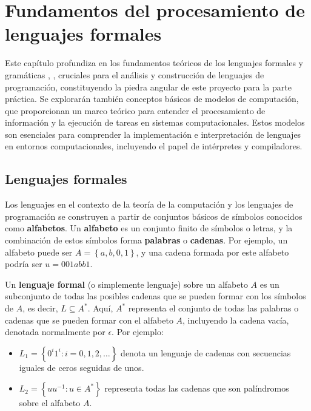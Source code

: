 \chapter{\textbf{Fundamentos del procesamiento de lenguajes formales}}
Este capítulo profundiza en los fundamentos teóricos de los lenguajes formales y gramáticas \cite{aho1990compiladores}, \cite{hopcroft2010introduccion}, cruciales para el análisis y construcción de lenguajes de programación, constituyendo la piedra angular de este proyecto para la parte práctica. Se explorarán también conceptos básicos de modelos de computación, que proporcionan un marco teórico para entender el procesamiento de información y la ejecución de tareas en sistemas computacionales. Estos modelos son esenciales para comprender la implementación e interpretación de lenguajes en entornos computacionales, incluyendo el papel de intérpretes y compiladores.

\section{Lenguajes formales}\label{section:languages}
Los lenguajes en el contexto de la teoría de la computación y los lenguajes de programación se construyen a partir de conjuntos básicos de símbolos conocidos como \textbf{alfabetos}. Un \textbf{alfabeto} es un conjunto finito de símbolos o letras, y la combinación de estos símbolos forma \textbf{palabras} o \textbf{cadenas}. Por ejemplo, un alfabeto puede ser $A = \left\lbrace a, b, 0, 1 \right\rbrace$, y una cadena formada por este alfabeto podría ser $u = 001abb1$.

Un \textbf{lenguaje formal} (o simplemente lenguaje) sobre un alfabeto $A$ es un subconjunto de todas las posibles cadenas que se pueden formar con los símbolos de $A$, es decir, $L \subseteq A^*$. Aquí, $A^*$ representa el conjunto de todas las palabras o cadenas que se pueden formar con el alfabeto $A$, incluyendo la cadena vacía, denotada normalmente por $\epsilon$. Por ejemplo:

\begin{itemize}
\item $L_1 = \left\lbrace 0^i 1^i : i = 0,1,2,\ldots \right\rbrace$ denota un lenguaje de cadenas con secuencias iguales de ceros seguidas de unos.
\item $L_2 = \left\lbrace uu^{-1} : u \in A^* \right\rbrace$ representa todas las cadenas que son palíndromos sobre el alfabeto $A$.
\end{itemize}

